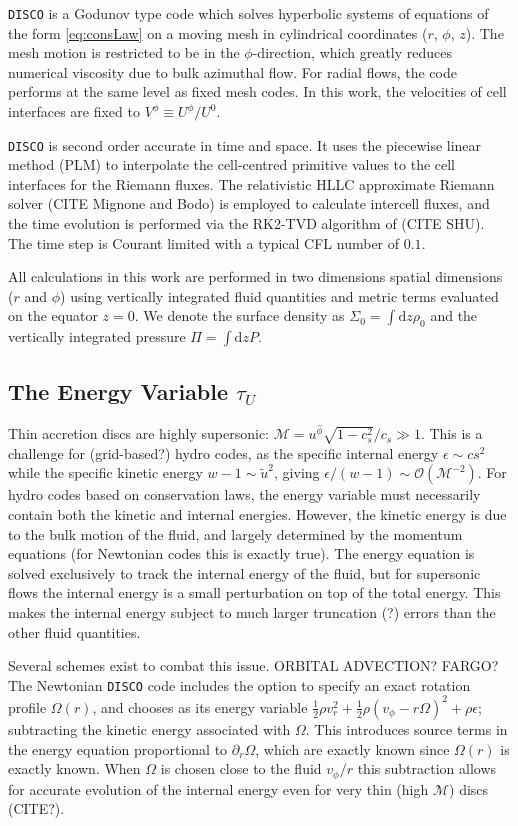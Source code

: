 \documentclass{emulateapj}
\newcommand{\eps}{\epsilon}
\newcommand{\Sig}{\Sigma}
\newcommand{\Om}{\Omega}
\newcommand{\Mach}{\mathcal{M}}
\newcommand{\pd}{\partial}
\newcommand{\dd}{\mbox{d}}
\newcommand{\DISCO}{{\texttt{DISCO}}}
\newcommand{\OO}{\mathcal{O}}
\begin{document}
\DISCO{} is a Godunov type code which solves hyperbolic systems of equations of the form \eqref{eq:consLaw} on a moving mesh in cylindrical coordinates ($r$, $\phi$, $z$).  The mesh motion is restricted to be in the $\phi$-direction, which greatly reduces numerical viscosity due to bulk azimuthal flow.  For radial flows, the code performs at the same level as fixed mesh codes.  In this work, the velocities of cell interfaces are fixed to $V^\phi \equiv U^\phi/U^0$.   

\DISCO{} is second order accurate in time and space.  It uses the piecewise linear method (PLM) to interpolate the cell-centred primitive values to the cell interfaces for the Riemann fluxes.  The relativistic HLLC approximate Riemann solver (CITE Mignone and Bodo) is employed to calculate intercell fluxes, and the time evolution is performed via the RK2-TVD algorithm of (CITE SHU).  The time step is Courant limited with a typical CFL number of $0.1$.

All calculations in this work are performed in two dimensions spatial dimensions ($r$ and $\phi$) using vertically integrated fluid quantities and metric terms evaluated on the equator $z=0$.  We denote the surface density as $\Sig_0 = \int \dd z \rho_0$ and the vertically integrated pressure $\Pi = \int \dd z P$.  

\subsection{The Energy Variable $\tau_U$}
\label{subsec:energy}

Thin accretion discs are highly supersonic: $\Mach = u^{\hat{\phi}} \sqrt{1-c_s^2}/c_s \gg 1$.  This is a challenge for (grid-based?) hydro codes, as the specific internal energy $\eps \sim cs^2$ while the specific kinetic energy $w-1 \sim \tilde{u}^2$, giving $\eps / (w-1) \sim \OO(\Mach^{-2})$.  For hydro codes based on conservation laws, the energy variable must necessarily contain both the kinetic and internal energies.  However, the kinetic energy is due to the bulk motion of the fluid, and largely determined by the momentum equations (for Newtonian codes this is exactly true).  The energy equation is solved exclusively to track the internal energy of the fluid, but for supersonic flows the internal energy is a small perturbation on top of the total energy.  This makes the internal energy subject to much larger truncation (?) errors than the other fluid quantities.

Several schemes exist to combat this issue.  ORBITAL ADVECTION? FARGO? The Newtonian \DISCO{} code includes the option to specify an exact rotation profile $\Om(r)$, and chooses as its energy variable $\frac{1}{2}\rho v_r^2 + \frac{1}{2}\rho(v_\phi-r\Om)^2 + \rho \eps$; subtracting the kinetic energy associated with $\Om$. This introduces source terms in the energy equation proportional to $\pd_r \Om$, which are exactly known since $\Om(r)$ is exactly known.  When $\Om$ is chosen close to the fluid $v_\phi / r$ this subtraction allows for accurate evolution of the internal energy even for very thin (high $\Mach$) discs (CITE?).
\end{document}
